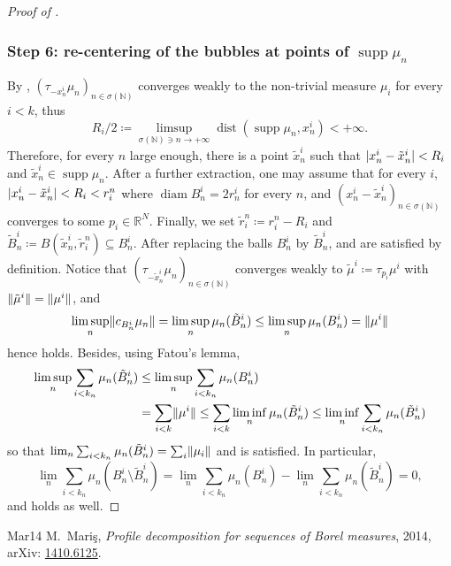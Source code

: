 \documentclass[11pt]{article}
\theoremstyle{plain}
\theoremstyle{definition}
\newcommand{\N}{\mathbb{N}}
\newcommand{\R}{\mathbb{R}}
\DeclarePairedDelimiter{\abs}{\lvert}{\rvert}
\DeclarePairedDelimiter{\norm}{\lVert}{\rVert}
\DeclareMathOperator{\supp}{supp}
\DeclareMathOperator{\diam}{diam}
\DeclareMathOperator{\dist}{dist}
\numberwithin{equation}{section}
\begin{document}
\begin{proof}[Proof of ]
\subsubsection*{Step 6: re-centering of the bubbles at points of \(\supp\mu_n\)}
By , $(\tau_{-x^i_{n}} \mu_n)_{n \in \sigma(\N)}$ converges weakly to the non-trivial measure $\mu_i$ for every $i<k$, thus
\begin{equation}
\label{finiteDistance}
R_i/2\coloneqq \limsup_{\sigma(\N) \ni n \to +\infty} \dist(\supp \mu_n, x_n^i) < +\infty.
\end{equation}
Therefore, for every $n$ large enough, there is a point $\tilde x_n^i$ such that $\abs{x_n^i-\tilde x_n^i} < R_i$ and $\tilde x_n^i \in \supp \mu_n$. After a further extraction, one may assume that for every $i$, $\abs{x_n^i-\tilde x_n^i} < R_i < r_i^n$ where $\diam B_n^i = 2r_n^i$ for every $n$, and $(x_n^i -\tilde x_n^i)_{n\in \sigma(\N)}$ converges to some $p_i \in \R^N$. Finally, we set $\tilde r_i^n \coloneqq r_i^n-R_i$ and $\tilde B_n^i \coloneqq B(\tilde x_n^i,\tilde r_i^n) \subseteq B_n^i$. After replacing the balls $B_n^i$ by $\tilde B_n^i$,  and  are satisfied by definition. Notice that $(\tau_{-\tilde x^i_{n}} \mu_n)_{n \in \sigma(\N)}$ converges weakly to $\tilde \mu^i \coloneqq \tau_{p_i} \mu^i$ with $\norm{\tilde \mu^i} = \norm{\mu^i}$, and
\[
\limsup_n \norm{c_{B_n^i} \mu_n} = \limsup_n \mu_n(\tilde B_n^i) \leq \limsup_n \mu_n(B_n^i) = \norm{\mu^i}
\]
hence  holds. Besides, using Fatou's lemma,
\begin{align*}
\limsup_n \sum_{i<k_n} \mu_n(\tilde B_n^i) &\leq \limsup_n \sum_{i<k_n} \mu_n(B_n^i)\\
&= \sum_{i<k} \norm{\mu^i}\leq \sum_{i<k} \liminf_n \mu_n(\tilde B_n^i) \leq \liminf_n \sum_{i<k_n} \mu_n(\tilde B_n^i)
\end{align*}
so that $\lim_n \sum_{i<k_n} \mu_n(\tilde B_n^i) = \sum_i \norm{\mu_i}$ and  is satisfied. In particular,
\[\lim_n \sum_{i<k_n} \mu_n(B_n^i\setminus \tilde B_n^i) = \lim_n \sum_{i<k_n} \mu_n(B_n^i) - \lim_n \sum_{i<k_n} \mu_n(\tilde B_n^i) = 0,\]
and  holds as well.
\end{proof}
\begin{thebibliography}{Mar14}
M.~Mari\c{s}, \emph{Profile decomposition for sequences of Borel measures}, 2014,
arXiv: \href{https://arxiv.org/abs/1410.6125}{1410.6125}.
\end{thebibliography}
\end{document}
